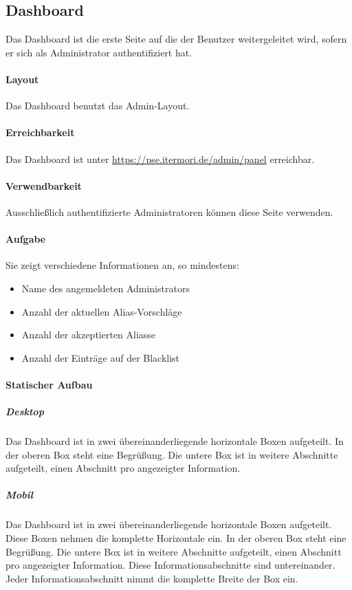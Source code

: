 \subsection{Dashboard}

Das Dashboard ist die erste Seite auf die der Benutzer weitergeleitet wird, sofern er sich als Administrator authentifiziert hat.

\paragraph*{Layout}
Das Dashboard benutzt das Admin-Layout.

\paragraph*{Erreichbarkeit}
Das Dashboard ist unter \href{https://pse.itermori.de/admin/panel}{https://pse.itermori.de/admin/panel} erreichbar.

\paragraph*{Verwendbarkeit}
Ausschließlich authentifizierte Administratoren können diese Seite verwenden.

\paragraph*{Aufgabe}
Sie zeigt verschiedene Informationen an, so mindestens:

\begin{itemize}
    \item Name des angemeldeten Administrators
    \item Anzahl der aktuellen Alias-Vorschläge
    \item Anzahl der akzeptierten Aliasse
    \item Anzahl der Einträge auf der Blacklist
\end{itemize}

\paragraph*{Statischer Aufbau}
\subparagraph*{Desktop}
Das Dashboard ist in zwei übereinanderliegende horizontale Boxen aufgeteilt.
In der oberen Box steht eine Begrüßung.
Die untere Box ist in weitere Abschnitte aufgeteilt, einen Abschnitt pro angezeigter Information.

\subparagraph*{Mobil}
Das Dashboard ist in zwei übereinanderliegende horizontale Boxen aufgeteilt. Diese Boxen nehmen die komplette Horizontale ein.
In der oberen Box steht eine Begrüßung.
Die untere Box ist in weitere Abschnitte aufgeteilt, einen Abschnitt pro angezeigter Information.
Diese Informationsabschnitte sind untereinander.
Jeder Informationsabschnitt nimmt die komplette Breite der Box ein.

